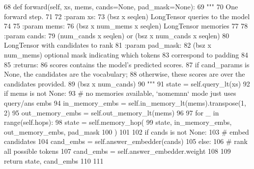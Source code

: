 \begin{DoxyCode}
68     \textcolor{keyword}{def }forward(self, xs, mems, cands=None, pad\_mask=None):
69         \textcolor{stringliteral}{"""}
70 \textcolor{stringliteral}{        One forward step.}
71 \textcolor{stringliteral}{}
72 \textcolor{stringliteral}{        :param xs:}
73 \textcolor{stringliteral}{            (bsz x seqlen) LongTensor queries to the model}
74 \textcolor{stringliteral}{}
75 \textcolor{stringliteral}{        :param mems:}
76 \textcolor{stringliteral}{            (bsz x num\_mems x seqlen) LongTensor memories}
77 \textcolor{stringliteral}{}
78 \textcolor{stringliteral}{        :param cands:}
79 \textcolor{stringliteral}{            (num\_cands x seqlen) or (bsz x num\_cands x seqlen)}
80 \textcolor{stringliteral}{            LongTensor with candidates to rank}
81 \textcolor{stringliteral}{        :param pad\_mask:}
82 \textcolor{stringliteral}{            (bsz x num\_mems) optional mask indicating which tokens}
83 \textcolor{stringliteral}{            correspond to padding}
84 \textcolor{stringliteral}{}
85 \textcolor{stringliteral}{        :returns:}
86 \textcolor{stringliteral}{            scores contains the model's predicted scores.}
87 \textcolor{stringliteral}{            if cand\_params is None, the candidates are the vocabulary;}
88 \textcolor{stringliteral}{            otherwise, these scores are over the candidates provided.}
89 \textcolor{stringliteral}{            (bsz x num\_cands)}
90 \textcolor{stringliteral}{        """}
91         state = self.query\_lt(xs)
92         \textcolor{keywordflow}{if} mems \textcolor{keywordflow}{is} \textcolor{keywordflow}{not} \textcolor{keywordtype}{None}:
93             \textcolor{comment}{# no memories available, `nomemnn` mode just uses query/ans embs}
94             in\_memory\_embs = self.in\_memory\_lt(mems).transpose(1, 2)
95             out\_memory\_embs = self.out\_memory\_lt(mems)
96 
97             \textcolor{keywordflow}{for} \_ \textcolor{keywordflow}{in} range(self.hops):
98                 state = self.memory\_hop(
99                     state, in\_memory\_embs, out\_memory\_embs, pad\_mask
100                 )
101 
102         \textcolor{keywordflow}{if} cands \textcolor{keywordflow}{is} \textcolor{keywordflow}{not} \textcolor{keywordtype}{None}:
103             \textcolor{comment}{# embed candidates}
104             cand\_embs = self.answer\_embedder(cands)
105         \textcolor{keywordflow}{else}:
106             \textcolor{comment}{# rank all possible tokens}
107             cand\_embs = self.answer\_embedder.weight
108 
109         \textcolor{keywordflow}{return} state, cand\_embs
110 
111 
\end{DoxyCode}


